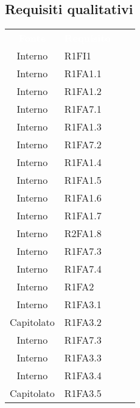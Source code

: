\subsection{Requisiti qualitativi}
{
\renewcommand{\arraystretch}{1.5}
\centering
\begin{longtable}{ c C{4cm} c c}
\textcolor{white}{\textbf{Fonte}} & \textcolor{white}{\textbf{Requisito}}\\	

Interno & R1FI1\\

Interno & R1FA1.1\\

Interno & R1FA1.2\\

Interno & R1FA7.1\\

Interno & R1FA1.3\\

Interno & R1FA7.2\\

Interno & R1FA1.4\\

Interno & R1FA1.5\\

Interno & R1FA1.6\\

Interno & R1FA1.7\\


Interno & R2FA1.8\\

Interno & R1FA7.3\\

Interno & R1FA7.4\\

Interno & R1FA2\\

Interno & R1FA3.1\\

Capitolato & R1FA3.2\\

Interno & R1FA7.3\\

Interno & R1FA3.3\\

Interno & R1FA3.4\\


Capitolato & R1FA3.5\\


\end{longtable}}
